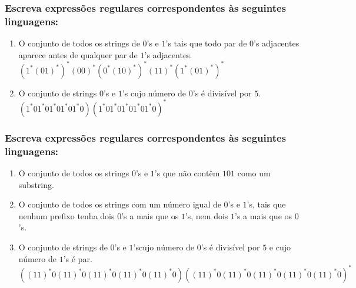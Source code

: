 \documentclass[a4paper,12pt]{article}
\begin{document}
        \subsubsection{Escreva expressões regulares corresponden\-tes às seguintes linguagens:}
            \begin{enumerate}[label={\bfseries \alph*)}]
                \item O conjunto de todos os strings de $0$'s e $1$'s tais que todo par de $0$'s adjacentes aparece antes de qualquer par de $1$'s adjacentes.
                    \\ $(1^*(01)^*)^*(00)^*(0^*(10)^*)^*(11)^*(1^*(01)^*)^*$
                \item O conjunto de strings $0$'s e $1$'s cujo número de $0$'s é divisível por $5$.
                    \\ $(1^*01^*01^*01^*01^*0)(1^*01^*01^*01^*01^*0)^*$
            \end{enumerate}
        
        \subsubsection{Escreva expressões regulares corresponden\-tes às seguintes linguagens:}
            \begin{enumerate}[start=1, label={\bfseries \alph*)}]
                \item O conjunto de todos os strings $0$'s e $1$'s que não contêm $101$ como um substring.
                    \\
                \item O conjunto de todos os strings com um número igual de $0$'s e $1$'s, tais que nenhum prefixo tenha dois $0$'s a mais que os $1$'s, nem dois $1$'s a mais que os $0$'s.
                \item O conjunto de strings de $0$'s e $1$'scujo número de $0$'s é divisível por $5$ e cujo número de $1$'s é par.
                    \\ $((11)^*0(11)^*0(11)^*0(11)^*0(11)^*0)((11)^*0(11)^*0(11)^*0(11)^*0(11)^*0)^*$
            \end{enumerate}
        
\end{document}
